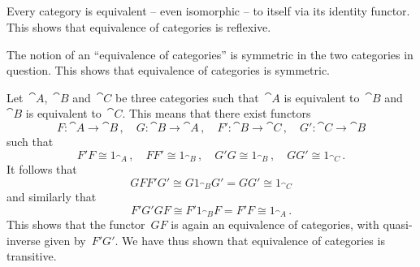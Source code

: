 \subsection{}

Every category is equivalent -- even isomorphic -- to itself via its identity functor.
This shows that equivalence of categories is reflexive.

The notion of an \enquote{equivalence of categories} is symmetric in the two categories in question.
This shows that equivalence of categories is symmetric.

Let~$\cat{A}$,~$\cat{B}$ and~$\cat{C}$ be three categories such that~$\cat{A}$ is equivalent to~$\cat{B}$ and~$\cat{B}$ is equivalent to~$\cat{C}$.
This means that there exist functors
\[
	F \colon \cat{A} \to \cat{B} \,,
	\quad
	G \colon \cat{B} \to \cat{A} \,,
	\quad
	F' \colon \cat{B} \to \cat{C} \,,
	\quad
	G' \colon \cat{C} \to \cat{B}
\]
such that
\[
	F' F ≅ 1_{\cat{A}} \,,
	\quad
	F F' ≅ 1_{\cat{B}} \,,
	\quad
	G' G ≅ 1_{\cat{B}} \,,
	\quad
	G G' ≅ 1_{\cat{C}} \,.
\]
It follows that
\[
	GF F'G'
	≅
	G 1_{\cat{B}} G'
	=
	G G'
	≅
	1_{\cat{C}}
\]
and similarly that
\[
	F'G' GF
	≅
	F' 1_{\cat{B}} F
	=
	F' F
	≅
	1_{\cat{A}} \,.
\]
This shows that the functor~$GF$ is again an equivalence of categories, with quasi-inverse given by~$F' G'$.
We have thus shown that equivalence of categories is transitive.
